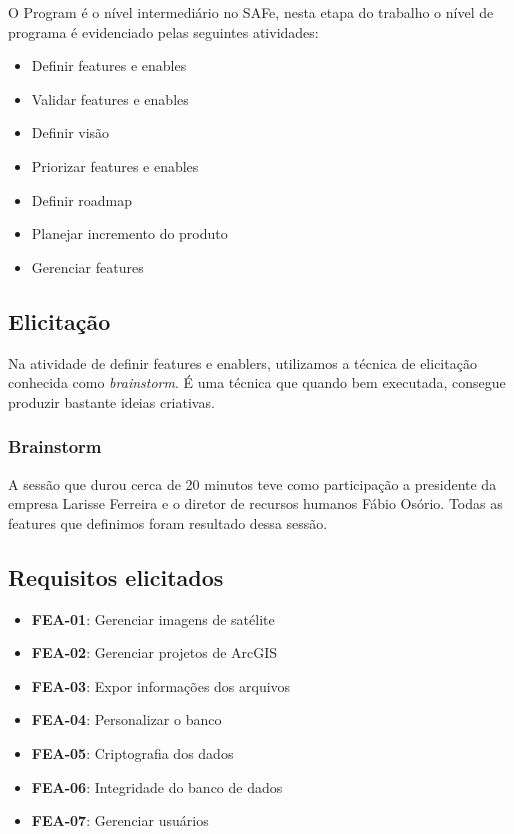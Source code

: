  O Program é o nível intermediário no SAFe, nesta etapa do trabalho o nível de programa é evidenciado pelas seguintes atividades:

  \begin{itemize}
    \item Definir features e enables
    \item Validar features e enables
    \item Definir visão
    \item Priorizar features e enables
    \item Definir roadmap
    \item Planejar incremento do produto
    \item Gerenciar features
  \end{itemize}

\subsection{Elicitação}
  Na atividade de definir features e enablers, utilizamos a técnica de elicitação conhecida como \textit{brainstorm}. É uma técnica que quando bem executada, consegue produzir bastante ideias criativas.

\subsubsection{Brainstorm}
  A sessão que durou cerca de 20 minutos teve como participação a presidente da empresa Larisse Ferreira e o diretor de recursos humanos Fábio Osório. Todas as features que definimos foram resultado dessa sessão.

\subsection{Requisitos elicitados}

  \begin{itemize}
    \item \textbf{FEA-01}: Gerenciar imagens de satélite
    \item \textbf{FEA-02}: Gerenciar projetos de ArcGIS
    \item \textbf{FEA-03}: Expor informações dos arquivos
    \item \textbf{FEA-04}: Personalizar o banco
    \item \textbf{FEA-05}: Criptografia dos dados
    \item \textbf{FEA-06}: Integridade do banco de dados
    \item \textbf{FEA-07}: Gerenciar usuários
  \end{itemize}

